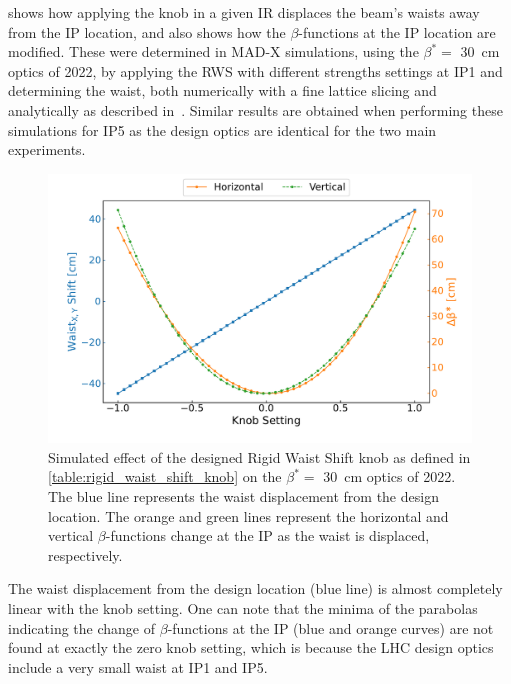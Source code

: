  shows how applying the knob in a given IR displaces the beam's waists away from the IP location, and also shows how the \(\beta\)-functions at the IP location are modified.
These were determined in MAD-X simulations, using the \(\beta^{\ast} =\) \qty{30}{\centi\metre} optics of \num{2022}, by applying the RWS with different strengths settings at IP\num{1} and determining the waist, both numerically with a fine lattice slicing and analytically as described in~\cite{PRAB:Carlier:KModulation_HiLumi}.
Similar results are obtained when performing these simulations for IP\num{5} as the design optics are identical for the two main experiments.

\begin{figure}[!htb]
    \centering
    \includegraphics[width=\textwidth]{Figures/IR_Coupling_Correction/rigid_waist_shift_waist_effect_combined.pdf}
    \caption{Simulated effect of the designed Rigid Waist Shift knob as defined in \cref{table:rigid_waist_shift_knob} on the \(\beta^{\ast} =\) \qty{30}{\centi\metre} optics of \num{2022}. The \textcolor{mplblue}{blue} line represents the waist displacement from the design location. The \textcolor{mplorange}{orange} and \textcolor{mplgreen}{green} lines represent the horizontal and vertical \(\beta\)-functions change at the IP as the waist is displaced, respectively.}
    \label{figure:rigid_waist_shift_knob_effect_on_waist}
\end{figure}

The waist displacement from the design location (\textcolor{mplblue}{blue} line) is almost completely linear with the knob setting.
One can note that the minima of the parabolas indicating the change of \(\beta\)-functions at the IP (\textcolor{mplblue}{blue} and \textcolor{mplorange}{orange} curves) are not found at exactly the zero knob setting, which is because the LHC design optics include a very small waist at IP\num{1} and IP\num{5}.

